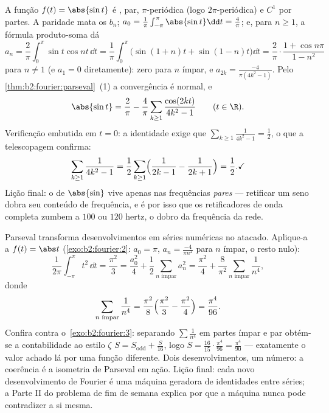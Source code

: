 \begin{example}\label{ex:b2:fourier:abssin}
A função $f(t) = \abs{\sin t}$ é , par,
$\pi$-periódica (logo $2\pi$-periódica) e $C^1$ por partes.
A paridade mata os $b_n$; $a_0 = \frac1\pi\int_{-\pi}^{\pi}
\abs{\sin t}\dd t = \frac4\pi$; e, para $n \geq 1$,
a fórmula produto-soma dá
\[
a_n = \frac2\pi\int_0^\pi \sin t\cos nt\,\dd t
= \frac{1}{\pi}\int_0^\pi\bigl(\sin(1+n)t +
\sin(1-n)t\bigr)\dd t
= \frac2\pi\cdot\frac{1 + \cos n\pi}{1 - n^2}
\]
para $n \neq 1$ (e $a_1 = 0$ diretamente): zero para $n$ ímpar, e
$a_{2k} = \frac{-4}{\pi(4k^2-1)}$. Pelo
\cref{thm:b2:fourier:parseval}~(1) a convergência é normal,
e
\[
\abs{\sin t} = \frac{2}{\pi} - \frac{4}{\pi}
\sum_{k\geq1}\frac{\cos(2kt)}{4k^2 - 1}
\qquad (t \in \R) .
\]
Verificação embutida em $t = 0$: a identidade exige que
$\sum_{k\geq1}\frac{1}{4k^2-1} = \frac12$, o que a telescopagem
confirma:
\[
\sum_{k\geq1}\frac{1}{4k^2-1}
= \frac12\sum_{k\geq1}\Bigl(\frac{1}{2k-1} -
\frac{1}{2k+1}\Bigr) = \frac12 . \checkmark
\]
Lição final: o  de $\abs{\sin}$ vive apenas nas
frequências \emph{pares} --- retificar um seno dobra seu
conteúdo de frequência, e é por isso que os retificadores de onda completa zumbem a
$100$ ou $120$ hertz, o dobro da frequência da rede.
\end{example}

\begin{example}\label{ex:b2:fourier:zetafourodd}
Parseval transforma desenvolvimentos em séries numéricas no atacado.
Aplique-a a $f(t) = \abs t$ (\cref{exo:b2:fourier:2}: $a_0 =
\pi$, $a_n = \frac{-4}{\pi n^2}$ para $n$ ímpar, o resto nulo):
\[
\frac{1}{2\pi}\int_{-\pi}^{\pi}t^2\,\dd t = \frac{\pi^2}{3}
= \frac{a_0^2}{4} + \frac12\sum_{n \text{ ímpar}} a_n^2
= \frac{\pi^2}{4} +
\frac{8}{\pi^2}\sum_{n\text{ ímpar}}\frac{1}{n^4} ,
\]
donde
\[
\sum_{n\text{ ímpar}}\frac{1}{n^4}
= \frac{\pi^2}{8}\Bigl(\frac{\pi^2}{3} -
\frac{\pi^2}{4}\Bigr) = \frac{\pi^4}{96} .
\]
Confira contra o~\cref{exo:b2:fourier:3}: separando
$\sum\frac1{n^4}$ em partes ímpar e par obtém-se a contabilidade ao estilo $\zeta$
$S = S_{\mathrm{odd}} + \frac{S}{16}$, logo $S =
\frac{16}{15}\cdot\frac{\pi^4}{96} = \frac{\pi^4}{90}$ ---
exatamente o valor achado lá por uma função diferente. Dois
desenvolvimentos, um número: a coerência é a isometria de Parseval
em ação. Lição final: cada novo desenvolvimento de Fourier é uma
máquina geradora de identidades entre séries; a Parte II do problema
de fim de semana explica por que a máquina nunca pode
contradizer a si mesma.
\end{example}

